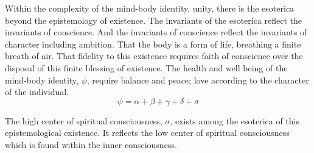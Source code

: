 

Within the complexity of the mind-body identity, unity, there is the
esoterica beyond the epistemology of existence.  The invariants of the
esoterica reflect the invariants of conscience.  And the invariants of
conscience reflect the invariants of character including ambition.
That the body is a form of life, breathing a finite breath of air.
That fidelity to this existence requires faith of conscience over the
disposal of this finite blessing of existence.  The health and well
being of the mind-body identity, $\psi$, require balance and peace;
love according to the character of the individual. $$\psi = \alpha + \beta + \gamma + \delta + \sigma$$

The high center of spiritual consciousness, $\sigma$, exists among the
esoterica of this epistemological existence.  It reflects the low
center of spiritual consciousness which is found within the inner
consciousness.

\bye

